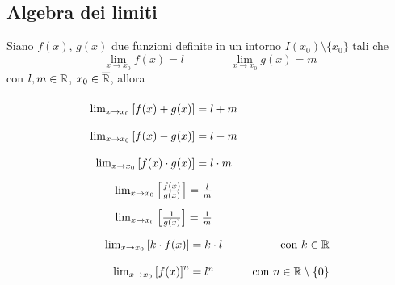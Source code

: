 \subsection{Algebra dei limiti}
\begin{shadedTheorem}
    Siano $f(x)$, $g(x)$ due funzioni definite in un intorno $I(x_0)\setminus \{x_0\}$ tali che
    \[\lim_{x\to x_0}f(x)=l\qquad \qquad \lim_{x\to x_0}g(x)=m\]
    con $l,m\in \mathbb{R}$, $x_0\in \overline{\mathbb{R}}$, allora
    \[\renewcommand{\arraystretch}{2}
        \begin{array}{cr}
        \lim_{x\to x_0}\left[ f(x) + g(x) \right] = l + m\\
        \lim_{x\to x_0}\left[ f(x) - g(x) \right] = l - m\\
        \lim_{x\to x_0}\left[ f(x) \cdot g(x) \right] = l \cdot m\\
        \lim_{x\to x_0}\left[ \frac{f(x)}{g(x)} \right] = \frac{l}{m}\\
        \lim_{x\to x_0}\left[ \frac{1}{g(x)} \right] = \frac{1}{m}\\
        \lim_{x\to x_0}\left[ k\cdot f(x)\right] = k\cdot l & \qquad\text{ con }k\in \R\\
        \lim_{x\to x_0}\left[ f(x) \right]^n = l^n & \text{ con }n\in \R\setminus\{0\}
    \end{array}\]
\end{shadedTheorem}
